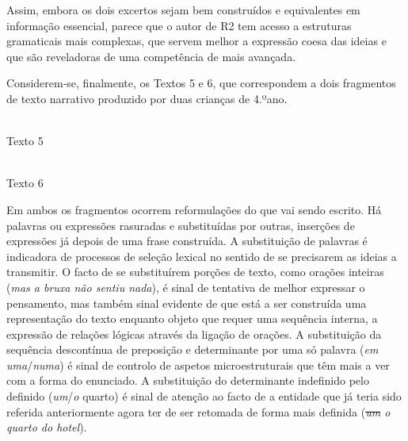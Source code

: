\documentclass[output=paper]{LSP/langsci}
\begin{document}
Assim, embora os dois excertos sejam bem construídos e equivalentes em informação essencial, parece que o autor de R2 tem acesso a estruturas gramaticais mais complexas, que servem melhor a expressão coesa das ideias e que são reveladoras de uma competência de  mais avançada. 

Considerem-se, finalmente, os Textos 5 e 6, que correspondem a dois fragmentos de texto narrativo produzido por duas crianças de 4.ºano. 

\begin{center}
\\\vspace{1em}Texto 5
\end{center}

\begin{center}
\\\vspace{1em}Texto 6
\end{center}

Em ambos os fragmentos ocorrem reformulações do que vai sendo escrito. Há palavras ou expressões rasuradas e substituídas por outras, inserções de expressões já depois de uma frase construída. A substituição de palavras é indicadora de processos de seleção lexical no sentido de se precisarem as ideias a transmitir. O facto de se substituírem porções de texto, como orações inteiras (\textit{mas a bruxa não sentiu nada}), é sinal de tentativa de melhor expressar o pensamento, mas também sinal evidente de que está a ser construída uma representação do texto enquanto objeto que requer uma sequência interna, a expressão de relações lógicas através da ligação de orações. A substituição da sequência descontínua de preposição e determinante por uma só palavra (\textit{em uma}/\textit{numa}) é sinal de controlo de aspetos microestruturais que têm mais a ver com a forma do enunciado. A substituição do determinante indefinido pelo definido (\textit{um}/\textit{o} quarto) é sinal de atenção ao facto de a entidade que já teria sido referida anteriormente agora ter de ser retomada de forma mais definida (\textit{\sout{um} o quarto do hotel}).
\end{document}
